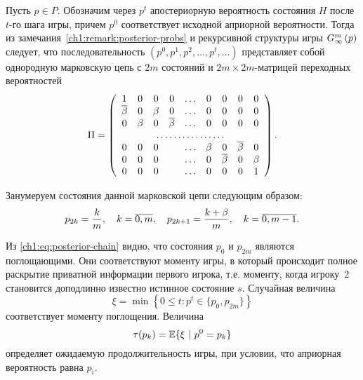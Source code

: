 {Пусть $p \in P$. Обозначим через $p^t$ апостериорную вероятность состояния $H$
после $t$-го шага игры, причем $p^0$ соответствует исходной априорной
вероятности. Тогда из замечания~\ref{ch1:remark:posterior-probs} и рекурсивной
структуры игры $G_{\infty}^m\left({p}\right)$ следует, что последовательность %
$(p^0, p^1, p^2, \ldots, p^t, \ldots)$ представляет собой однородную марковскую
цепь с $2m$ состояний и $2m \times 2m$-матрицей переходных вероятностей
\begin{equation}
  \label{ch1:eq:posterior-chain}
  \Pi = 
  \left(
    \begin{array}{ccccccccc}
      1    & 0   & 0   & 0    & \ldots & 0   & 0    & 0    & 0   \\
      \DCo & 0   & \Co & 0    & \ldots & 0   & 0    & 0    & 0   \\
      0    & \Co & 0   & \DCo & \ldots & 0   & 0    & 0    & 0   \\
      \hdotsfor{9}                                               \\
      0    & 0   & 0   &      & \ldots & \Co & 0    & \DCo & 0   \\
      0    & 0   & 0   &      & \ldots & 0   & \DCo & 0    & \Co \\
      0    & 0   & 0   &      & \ldots & 0   & 0    & 0    & 1
    \end{array}
 \right).
\end{equation}

Занумеруем состояния данной марковской цепи следующим образом:
\begin{gather*}
  p_{2k} = \frac{k}{m}, \quad k = \overline{0, m}, \quad
  p_{2k+1} = \frac{k+\beta}{m}, \quad k = \overline{0, m-1}.
\end{gather*}

Из \eqref{ch1:eq:posterior-chain} видно, что состояния $p_0$ и $p_{2m}$ являются
поглощающими. Они соответствуют моменту игры, в который происходит полное
раскрытие приватной информации первого игрока, т.е. моменту, когда игроку~2
становится доподлинно известно истинное состояние $s$. Случайная величина
\begin{equation*}
  \xi = \min \left\{ 0 \leq t: p^t \in \{p_0, p_{2m}\} \right\}
\end{equation*}
соответствует моменту поглощения. Величина
\begin{equation*}
  \tau(p_k) = \operatorname{\mathbb{E}} \{ \xi\ |\ p^0 = p_k \}
\end{equation*}
определяет ожидаемую продолжительность игры, при условии, что априорная
вероятность равна $p_i$.

}
